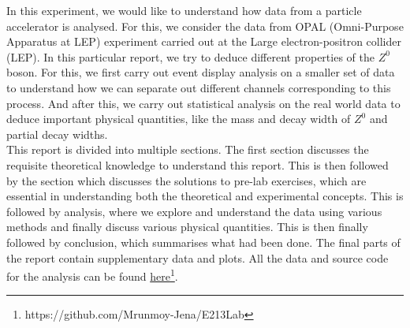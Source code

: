 In this experiment, we would like to understand how data from a particle accelerator is analysed. For this, we consider the data from OPAL (Omni-Purpose Apparatus at LEP) experiment carried out at the Large electron-positron collider (LEP). In this particular report, we try to deduce different properties of the $Z^0$ boson. For this, we first carry out event display analysis on a smaller set of data to understand how we can separate out different channels corresponding to this process. And after this, we carry out statistical analysis on the real world data to deduce important physical quantities, like the mass and decay width of $Z^0$ and partial decay widths.\\
This report is divided into multiple sections. The first section discusses the requisite theoretical knowledge to understand this report. This is then followed by the section which discusses the solutions to pre-lab exercises, which are essential in understanding both the theoretical and experimental concepts. This is followed by analysis, where we explore and understand the data using various methods and finally discuss various physical quantities. This is then finally followed by conclusion, which summarises what had been done. The final parts of the report contain supplementary data and plots. All the data and source code for the analysis can be found \href{https://github.com/Mrunmoy-Jena/E213Lab}{here}\footnote{https://github.com/Mrunmoy-Jena/E213Lab}.